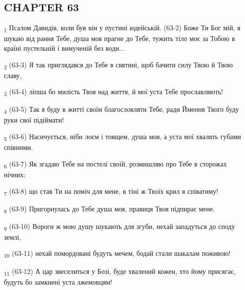 \subsection{CHAPTER 63}
\begin{tcolorbox}
\textsubscript{1} Псалом Давидів, коли був він у пустині юдейській. (63-2) Боже Ти Бог мій, я шукаю від рання Тебе, душа моя прагне до Тебе, тужить тіло моє за Тобою в країні пустельній і вимученій без води...
\end{tcolorbox}
\begin{tcolorbox}
\textsubscript{2} (63-3) Я так приглядався до Тебе в святині, щоб бачити силу Твою й Твою славу,
\end{tcolorbox}
\begin{tcolorbox}
\textsubscript{3} (63-4) ліпша бо милість Твоя над життя, й мої уста Тебе прославляють!
\end{tcolorbox}
\begin{tcolorbox}
\textsubscript{4} (63-5) Так я буду в житті своїм благословляти Тебе, ради Ймення Твого буду руки свої підіймати!
\end{tcolorbox}
\begin{tcolorbox}
\textsubscript{5} (63-6) Насичується, ніби лоєм і товщем, душа моя, а уста мої хвалять губами співними.
\end{tcolorbox}
\begin{tcolorbox}
\textsubscript{6} (63-7) Як згадаю Тебе на постелі своїй, розмишляю про Тебе в сторожах нічних:
\end{tcolorbox}
\begin{tcolorbox}
\textsubscript{7} (63-8) що став Ти на поміч для мене, в тіні ж Твоїх крил я співатиму!
\end{tcolorbox}
\begin{tcolorbox}
\textsubscript{8} (63-9) Пригорнулась до Тебе душа моя, правиця Твоя підпирає мене.
\end{tcolorbox}
\begin{tcolorbox}
\textsubscript{9} (63-10) Вороги ж мою душу шукають для згуби, нехай западуться до споду землі,
\end{tcolorbox}
\begin{tcolorbox}
\textsubscript{10} (63-11) нехай помордовані будуть мечем, бодай стали шакалам поживою!
\end{tcolorbox}
\begin{tcolorbox}
\textsubscript{11} (63-12) А цар звеселиться у Бозі, буде хвалений кожен, хто йому присягає, будуть бо замкнені уста лжемовцям!
\end{tcolorbox}
